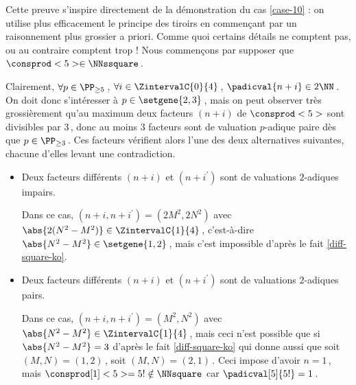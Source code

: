 Cette preuve s'inspire directement de la démonstration du cas \ref{case-10} : on utilise plus efficacement le principe des tiroirs en commençant par un raisonnement plus grossier a priori. Comme quoi certains détails ne comptent pas, ou au contraire comptent trop !
Nous commençons par supposer que $\consprod<5> \in \NNssquare$\,.
    
\smallskip

Clairement, 
$\forall p \in \PP_{\geq 5}$\,, 
$\forall i \in \ZintervalC{0}{4}$\,, 
$\padicval{n + i} \in 2 \NN$\,.
On doit donc s'intéresser à $p \in \setgene{2, 3}$\,, mais on peut observer très grossièrement qu'au maximum deux facteurs $(n + i)$ de $\consprod<5>$ sont divisibles par $3$\,, donc au moins $3$ facteurs sont de valuation $p$-adique paire dès que $p \in \PP_{\geq 3}$\,.
Ces facteurs vérifient alors l'une des deux alternatives suivantes,
chacune d'elles levant une contradiction.
%
\begin{itemize}
	\medskip
	\item Deux facteurs différents $(n+i)$ et $(n+i^\prime)$ sont de valuations $2$-adiques impairs.
		
	\smallskip
	\noindent
	Dans ce cas, $(n+i, n+i^\prime) = (2 M^2, 2 N^2)$ avec $\abs{2(N^2 - M^2)} \in \ZintervalC{1}{4}$\,, c'est-à-dire $\abs{N^2 - M^2} \in \setgene{1, 2}$\,, mais c'est impossible d'après le fait \ref{diff-square-ko}.


	\medskip
	\item Deux facteurs différents $(n+i)$ et $(n+i^\prime)$ sont de valuations $2$-adiques pairs.
		
	\smallskip
	\noindent
	Dans ce cas, $(n+i, n+i^\prime) = (M^2, N^2)$ avec $\abs{N^2 - M^2} \in \ZintervalC{1}{4}$\,, mais ceci n'est possible que si $\abs{N^2 - M^2} = 3$ d'après le fait \ref{diff-square-ko} qui donne aussi que soit $(M, N) = (1, 2)$\,, soit $(M, N) = (2, 1)$\,.
	Ceci impose d'avoir $n = 1$\,, mais $\consprod[1]<5> = 5! \notin \NNsquare$ car $\padicval[5]{5!} = 1$\,.
	\qedhere
\end{itemize}
